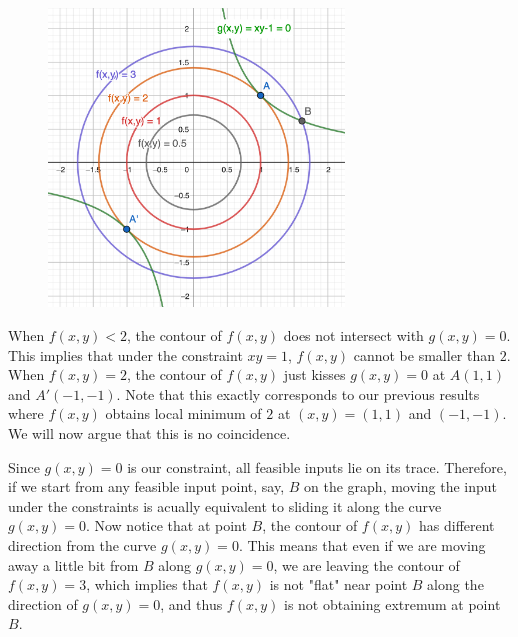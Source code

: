 \begin{figure}[ht]
    \begin{center}
        \includegraphics[width = 0.7\textwidth]{figures/chap 08/Lagrange.png}
    \end{center}
\end{figure}

When $f(x,y) < 2$, the contour of $f(x,y)$ does not intersect with $g(x,y) = 0$.  This implies that under the constraint $xy=1$, $f(x,y)$ cannot be smaller than $2$.  When $f(x,y) = 2$, the contour of $f(x,y)$ just kisses $g(x,y) = 0$ at $A(1,1)$ and $A'(-1,-1)$.  Note that this exactly corresponds to our previous results where $f(x,y)$ obtains local minimum of $2$ at $(x,y) = (1,1)$ and $(-1,-1)$.  We will now argue that this is no coincidence.  

Since $g(x,y) = 0$ is our constraint, all feasible inputs lie on its trace.  Therefore, if we start from any feasible input point, say, $B$ on the graph, moving the input under the constraints is acually equivalent to sliding it along the curve $g(x,y) = 0$.  Now notice that at point $B$, the contour of $f(x,y)$ has different direction from the curve $g(x,y) = 0$.  This means that even if we are moving away a little bit from $B$ along $g(x,y) = 0$, we are leaving the contour of $f(x,y) = 3$, which implies that $f(x,y)$ is not "flat" near point $B$ along the direction of $g(x,y) = 0$, and thus $f(x,y)$ is not obtaining extremum at point $B$.  

